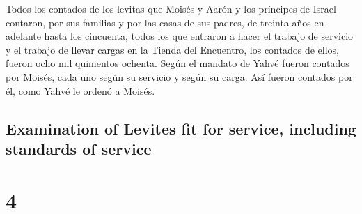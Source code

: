 \begin{paracol}{2}
 Todos los contados de los levitas que Moisés y Aarón y
los príncipes de Israel contaron, por sus familias y por las casas de
sus padres,  de treinta años en adelante hasta los
cincuenta, todos los que entraron a hacer el trabajo de servicio y el
trabajo de llevar cargas en la Tienda del Encuentro,  los
contados de ellos, fueron ocho mil quinientos ochenta. 
Según el mandato de Yahvé fueron contados por Moisés, cada uno según su
servicio y según su carga. Así fueron contados por él, como Yahvé le
ordenó a Moisés.

\switchcolumn
\begin{otherlanguage}{english}

\hypertarget{examination-of-levites-fit-for-service-including-standards-of-service}{%
\subsection{Examination of Levites fit for service, including standards
of
service}\label{examination-of-levites-fit-for-service-including-standards-of-service}}

\hypertarget{section-7}{%
\section{4}\label{section-7}}


\end{otherlanguage}
\end{paracol}
